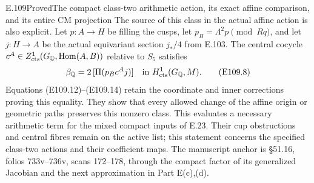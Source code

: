 \begin{statement}{E.109}{Proved}{The compact class-two arithmetic action, its exact affine comparison, and its entire CM projection}
The source of this class in the actual affine action is also
explicit.  Let $p:A\to H$ be filling the cusps, let
$p_B=\Lambda^2p\pmod{Rq}$, and let $j:H\to A$ be the actual
equivariant section $j_*/4$ from E.103.  The central cocycle
$c^A\in Z^1_{\rm cts}(G_{\mathbb Q},\operatorname{Hom}(A,B))$
relative to $S_5$ satisfies
\[
 \beta_{\mathbb Q}
   =2\,[\Pi(p_Bc^Aj)]\quad\hbox{in }
        H^1_{\rm cts}(G_{\mathbb Q},M).
 \tag{E109.8}
\]
Equations (E109.12)--(E109.14) retain the coordinate and inner
corrections proving this equality.  They show that every allowed
change of the affine origin or geometric paths preserves this
nonzero class.  This evaluates a necessary arithmetic term for
the mixed compact inputs of E.23.  Their cup obstructions and
central fibres remain on the active list; this statement concerns
the specified class-two actions and their coefficient maps.
The manuscript anchor is \S51.16, folios 733v--736v,
scans 172--178, through the compact factor of its generalized
Jacobian and the next approximation in Part E(c),(d).
\end{statement}
